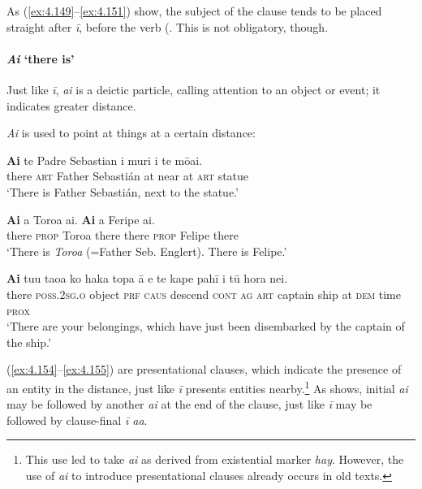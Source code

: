 As (\ref{ex:4.149}–\ref{ex:4.151}) show, the subject of the clause tends to be placed straight after \textit{{\ꞌ}ī}, before the verb (. This is not obligatory, though. 

\paragraph{\textit{{\ꞌ}Ai} ‘there is’}\label{sec:4.5.4.1.2}
Just like \textit{{\ꞌ}ī}, \textit{{\ꞌ}ai} is a deictic particle, calling attention to an object or event; it indicates greater distance.

\textit{{\ꞌ}Ai} is used to point at things at a certain distance:

\ea\label{ex:4.153}
\gll \textbf{{\ꞌ}Ai} te Padre Sebastian {\ꞌ}i muri i te mōai. \\
there \textsc{art} Father Sebastián at near at \textsc{art} statue \\

\glt 
‘There is Father Sebastián, next to the statue.’ \textstyleExampleref{[R412.180]} 
\z

\ea\label{ex:4.154}
\gll \textbf{{\ꞌ}Ai} a Toroa {\ꞌ}ai. \textbf{{\ꞌ}Ai} a Feripe {\ꞌ}ai.  \\
there \textsc{prop} Toroa there there \textsc{prop} Felipe there  \\

\glt 
‘There is \textit{Toroa} (=Father Seb. Englert). There is Felipe.’ \textstyleExampleref{[R411.134–135]}
\z

\ea\label{ex:4.155}
\gll \textbf{{\ꞌ}Ai} tu{\ꞌ}u tao{\ꞌ}a ko haka topa {\ꞌ}ā e te kape pahī {\ꞌ}i tū hora nei. \\
there \textsc{poss.2sg.o} object \textsc{prf} \textsc{caus} descend \textsc{cont} \textsc{ag} \textsc{art} captain ship at \textsc{dem} time \textsc{prox} \\

\glt
‘There are your belongings, which have just been disembarked by the captain of the ship.’ \textstyleExampleref{[R231.142]} 
\z

	(\ref{ex:4.154}–\ref{ex:4.155}) are presentational clauses, which indicate the presence of an entity in the distance, just like \textit{{\ꞌ}ī} presents entities nearby.\footnote{\label{fn:202}This use led \citet[319]{Fischer2001Hispan} to take \textit{{\ꞌ}ai} as derived from  existential marker \textit{hay}. However, the use of \textit{{\ꞌ}ai} to introduce presentational clauses already occurs in old texts.} As  shows, initial \textit{{\ꞌ}ai} may be followed by another \textit{{\ꞌ}ai} at the end of the clause, just like \textit{{\ꞌ}ī} may be followed by clause-final \textit{{\ꞌ}ī a{\ꞌ}a}.

